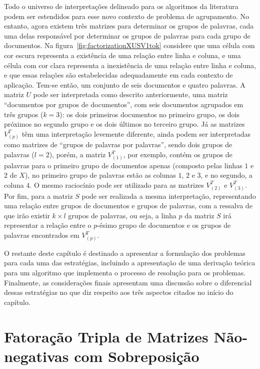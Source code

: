 \documentclass[
    12pt,                %
    oneside,            %
    a4paper,            %
    english,            %
    brazil                %
    ]{abntex2ppgsi}
\begin{document}
Todo o universo de interpretações delineado para os algoritmos da literatura podem ser estendidos para esse novo contexto de problema de agrupamento.
No entanto, agora existem três matrizes para determinar os grupos de palavras, cada uma delas responsável por determinar os grupos de palavras para cada grupo de documentos.
Na figura~\ref{fig:factorizationXUSV1tok} considere que uma célula com cor escura representa a existência de uma relação entre linha e coluna, e uma célula com cor clara representa a inexistência de uma relação entre linha e coluna, e que essas relações são estabelecidas adequadamente em cada contexto de aplicação.
Tem-se então, um conjunto de seis documentos e quatro palavras.
A matriz $U$ pode ser interpretada como descrito anteriormente, uma matriz ``documentos por grupos de documentos'', com seis documentos agrupados em três grupos ($k = 3$): os dois primeiros documentos no primeiro grupo, os dois próximos no segundo grupo e os dois últimos no terceiro grupo.
Já as matrizes $V_{(p)}^T$ têm uma interpretação levemente diferente, ainda podem ser interpretadas como matrizes de ``grupos de palavras por palavras'', sendo dois grupos de palavras ($l = 2$), porém, a matriz $V_{(1)}^T$, por exemplo, contém os grupos de palavras para o primeiro grupo de documentos apenas (composto pelas linhas $1$ e $2$ de $X$), no primeiro grupo de palavras estão as colunas $1$, $2$ e $3$, e no segundo, a coluna $4$.
O mesmo raciocínio pode ser utilizado para as matrizes $V_{(2)}^T$ e $V_{(3)}^T$.
Por fim, para a matriz $S$ pode ser realizada a mesma interpretação, representando uma relação entre grupos de documentos e grupos de palavras, com a ressalva de que irão existir $k \times l$ grupos de palavras, ou seja, a linha $p$ da matriz $S$ irá representar a relação entre o $p$-ésimo grupo de documentos e os grupos de palavras encontrados em $V_{(p)}^T$.

O restante deste capítulo é destinado a apresentar a formulação dos problemas para cada uma das estratégias, incluindo a apresentação de uma derivação teórica para um algoritmo que implementa o processo de resolução para os problemas.
Finalmente, as considerações finais apresentam uma discussão sobre o diferencial dessas estratégias no que diz respeito aos três aspectos citados no início do capítulo.

\section{Fatoração Tripla de Matrizes Não-negativas com Sobreposição}
\end{document}
